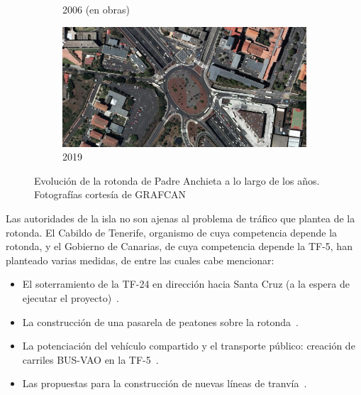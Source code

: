 \begin{figure}[h]
\begin{subfigure}[t]{.49\textwidth}
      \caption{2006 (en obras)}
      \label{fig:anchieta2006}
    \end{subfigure}
    \hfill
    \begin{subfigure}[t]{.49\textwidth}
      \centering
      \includegraphics[width=\textwidth]{report/images/amp-anchieta-2019.png}
      \caption{2019}
      \label{fig:anchieta2019}
    \end{subfigure}
    \caption[Evolución de la rotonda de Padre Anchieta a lo largo de los años.]{Evolución de la rotonda de Padre Anchieta a lo largo de los años. Fotografías cortesía de GRAFCAN\protect\footnotemark}
    \label{fig:anchieta_ev}
\end{figure}


Las autoridades de la isla no son ajenas al problema de tráfico que plantea de la rotonda. El Cabildo de Tenerife, organismo de cuya competencia depende la rotonda, y el Gobierno de Canarias, de cuya competencia depende la TF-5, han planteado varias medidas, de entre las cuales cabe mencionar:

\begin{itemize}
    \item El soterramiento de la TF-24 en dirección hacia Santa Cruz (a la espera de ejecutar el proyecto)~\cite{dia_cabildo_2019}.
    \item La construcción de una pasarela de peatones sobre la rotonda~\cite{rozas_pasarela_2019}.
    \item La potenciación del vehículo compartido y el transporte público: creación de carriles BUS-VAO en la TF-5~\cite{20minutos_gobierno_2019}.
    \item Las propuestas para la construcción de nuevas líneas de tranvía~\cite{redaccion_de_eldiarioes_cabildo_2020}.
\end{itemize}


